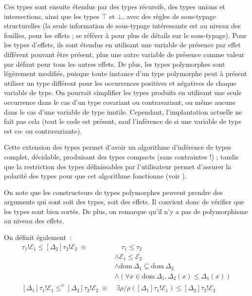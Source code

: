 \documentclass[a4paper,10pt]{article}
\begin{document}
Ces types sont ensuite étendus par des types récursifs, des types unions et intersections, ainsi que les types $\top$ et $\bot$, avec des règles de sous-typage structurelles (la seule information de sous-typage intéressante est au niveau des feuilles, pour les effets ; se référer à \cite{dolan2017algebraic} pour plus de détails sur le sous-typage). Pour les types d'effets, ils sont étendus en utilisant une variable de présence par effet différent pouvant être présent, plus une autre variable de présence comme valeur par défaut pour tous les autres effets. De plus, les types polymorphes sont légèrement modifiés, puisque toute instance d'un type polymorphe peut à présent utiliser un type différent pour les occurrences positives et négatives de chaque variable de type. On pourrait simplifier les types produits en utilisant une seule occurrence dans le cas d'un type covariant ou contravariant, ou même aucune dans le cas d'une variable de type inutile. Cependant, l'implantation actuelle ne fait pas cela (tout le code est présent, sauf l'inférence de si une variable de type est co- ou contravariante).

Cette extension des types permet d'avoir un algorithme d'inférence de types complet, décidable, produisant des types compacts (sans contraintes !) ; tandis que la restriction des types définissables par l'utilisateur permet d'assurer la polarité des types pour que cet algorithme fonctionne (voir \cite{dolan2017algebraic}).

On note que les constructeurs de types polymorphes peuvent prendre des arguments qui sont soit des types, soit des effets. Il convient donc de vérifier que les types sont bien sortés. De plus, on remarque qu'il n'y a pas de polymorphisme au niveau des effets.

On définit également~:
\begin{align*}
[\Delta_1]\tau_1!\mathcal{E}_1 \leqslant [\Delta_2]\tau_2!\mathcal{E}_2 ~\equiv&\quad \tau_1 \leqslant \tau_2 \\&\wedge \mathcal{E}_1 \leqslant \mathcal{E}_2 \\&\wedge \mathrm{dom}~\Delta_1 \subseteq \mathrm{dom}~\Delta_2 \\&\wedge (\forall x \in \mathrm{dom}~\Delta_1, \Delta_2(x) \leqslant \Delta_1(x)) \\
[\Delta_1]\tau_1!\mathcal{E}_1 \leqslant^\forall [\Delta_2]\tau_2!\mathcal{E}_2~\equiv&~\exists \rho / \rho([\Delta_1]\tau_1!\mathcal{E}_1) \leqslant [\Delta_2]\tau_2!\mathcal{E}_2
\end{align*}
\end{document}
